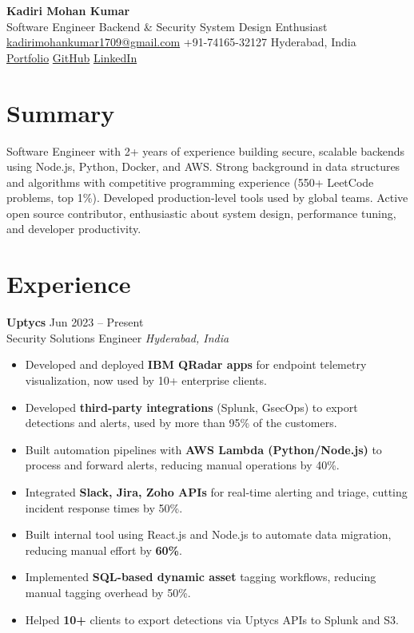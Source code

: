 \documentclass[a4paper,10pt]{article}
\newcommand{\resumeItem}[1]{\item\small{#1}}
\newcommand{\resumeSubheading}[4]{
  \vspace{2pt}\textbf{#1} \hfill {#2}\\
  {\small#3} \hfill {\small\textit{#4}}\\[-4pt]
}
\begin{document}
\begin{center}
  {\LARGE\bfseries Kadiri Mohan Kumar}\\
  \vspace{3pt}
  \small
  Software Engineer \textbar{} Backend \& Security \textbar{} System Design Enthusiast\\
  \href{mailto:kadirimohankumar1709@gmail.com}{kadirimohankumar1709@gmail.com} \textbar{} +91-74165-32127 \textbar{} Hyderabad, India\\
  \href{https://mohankumarkadiri.vercel.app}{Portfolio} \textbar{} \href{https://github.com/mohankumarkadiri}{GitHub} \textbar{} \href{https://www.linkedin.com/in/mohankumarkadiri/}{LinkedIn}
\end{center}

\section*{Summary}
Software Engineer with 2+ years of experience building secure, scalable backends using Node.js, Python, Docker, and AWS. Strong background in data structures and algorithms with competitive programming experience (550+ LeetCode problems, top 1\%). Developed production-level tools used by global teams. Active open source contributor, enthusiastic about system design, performance tuning, and developer productivity.

\section*{Experience}
\resumeSubheading{Uptycs}{Jun 2023 -- Present}{Security Solutions Engineer}{Hyderabad, India}
\begin{itemize}[leftmargin=*,itemsep=2pt]
  \resumeItem{Developed and deployed \textbf{IBM QRadar apps} for endpoint telemetry visualization, now used by 10+ enterprise clients.}
  \resumeItem{Developed \textbf{third-party integrations} (Splunk, GsecOps) to export detections and alerts, used by more than 95\% of the customers.}
  \resumeItem{Built automation pipelines with \textbf{AWS Lambda (Python/Node.js)} to process and forward alerts, reducing manual operations by 40\%.}
  \resumeItem{Integrated \textbf{Slack, Jira, Zoho APIs} for real-time alerting and triage, cutting incident response times by 50\%.}
  \resumeItem{Built internal tool using React.js and Node.js to automate data migration, reducing manual effort by \textbf{60\%}.}
  \resumeItem{Implemented \textbf{SQL-based dynamic asset} tagging workflows, reducing manual tagging overhead by 50\%.}
  \resumeItem{Helped \textbf{10+} clients to export detections via Uptycs APIs to Splunk and S3.}
\end{itemize}
\end{document}
